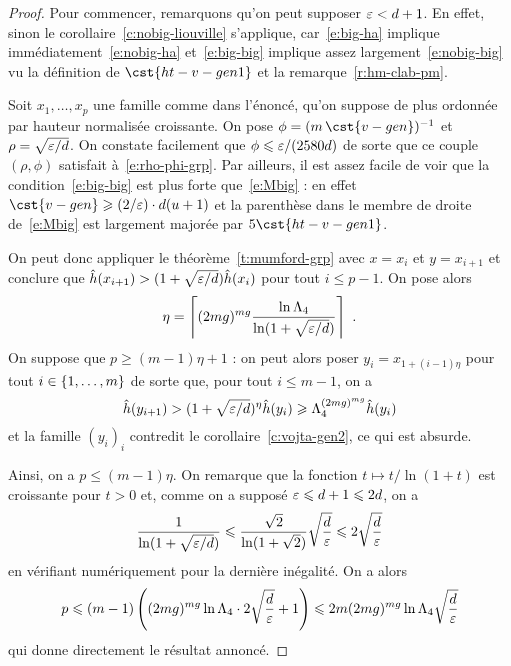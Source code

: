 \begin{proof}
  Pour commencer, remarquons qu'on peut supposer \( \varepsilon < d + 1 \). En
  effet, sinon le corollaire~\vref{c:nobig-liouville} s'applique,
  car~\eqref{e:big-ha} implique immédiatement~\eqref{e:nobig-ha}
  et~\eqref{e:big-big} implique assez largement~\eqref{e:nobig-big} vu la
  définition de \( \cst{ht-v-gen1} \) et la remarque~\vref{r:hm-clab-pm}.

  Soit \( x_1, \dots, x_p \) une famille comme dans l'énoncé, qu'on suppose de
  plus ordonnée par hauteur normalisée croissante. On pose
  \( \phi =( m \, \cst{v-gen})^{-1} \) et
  \( \rho = \sqrt{ \varepsilon / d } \).  On constate facilement que
  \( \phi \leqslant \varepsilon / (2580 d) \) de sorte que ce couple \( (\rho, \phi) \)
  satisfait à~\eqref{e:rho-phi-grp}. Par ailleurs, il est assez facile de voir
  que la condition~\eqref{e:big-big} est plus forte que~\eqref{e:Mbig} : en
  effet \( \cst{v-gen} \ge (2/\eps) \cdot \adeg (\adim+1) \) et la parenthèse
  dans le membre de droite de~\eqref{e:Mbig} est largement majorée par \( 5
    \cst{ht-v-gen1} \).

  On peut donc appliquer le théorème~\vref{t:mumford-grp} avec \( x = x_i \)
  et \( y = x_{i+1} \) et conclure que
  \( \hat h ( x_{i+1} ) > (1 + \sqrt{\varepsilon / d}) \hat h ( x_i ) \) pour tout
  \( i \le p-1 \). On pose alors
  \begin{equation}
    \eta
    =
    \left\lceil
      (2mg)^{mg}
      \frac{ \ln \Lambda_4 }{ \ln (1 + \sqrt{\varepsilon / d}) }
    \right\rceil
    \text{ .}
  \end{equation}
  On suppose que \( p \ge (m-1) \eta + 1 \) : on peut alors poser
  \( y_i = x_{1 + (i-1) \eta} \) pour tout \( i \in \lbrace1, \dots, m\rbrace \) de
  sorte que, pour tout \( i \le m-1 \), on a
  \begin{equation}
    \hat h ( y_{i+1} )
    >
    (1 + \sqrt{\varepsilon / d})^\eta
    \hat h ( y_i )
    \geqslant
    \Lambda_4^{(2mg)^{mg}}
    \hat h ( y_i )
  \end{equation}
  et la famille \( (y_i)_i \) contredit le corollaire~\vref{c:vojta-gen2}, ce
  qui est absurde.

  Ainsi, on a \( p \le (m-1) \eta \). On remarque que la fonction \( t
    \mapsto t / \ln(1+t) \) est croissante pour \( t > 0 \) et, comme on a
  supposé \( \varepsilon \leqslant d+1 \leqslant 2d \), on a
  \begin{equation}
    \frac1{ \ln(1 + \sqrt{\varepsilon/d}) }
    \leqslant
    \frac{ \sqrt2 }{ \ln(1 + \sqrt2) }
    \sqrt{ \frac d {\varepsilon} }
    \leqslant
    2 \sqrt{ \frac d {\varepsilon} }
  \end{equation}
  en vérifiant numériquement pour la dernière inégalité. On a alors
  \begin{equation}
    p
    \leqslant
    (m - 1)
    \left(
      (2mg)^{mg} \ln \Lambda_4
      \cdot 2 \sqrt{ \frac d {\varepsilon} }
      + 1
    \right)
    \leqslant
    2 m
    (2mg)^{mg} \ln \Lambda_4
    \sqrt{ \frac d {\varepsilon} }
  \end{equation}
  qui donne directement le résultat annoncé.
\end{proof}

